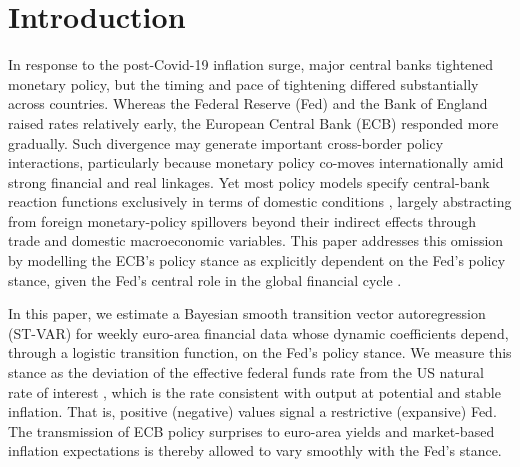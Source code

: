\section{Introduction}\label{sec:introduction}


In response to the post-Covid-19 inflation surge, major central banks tightened monetary policy, but the timing and pace of tightening differed substantially across countries. Whereas the Federal Reserve (Fed) and the Bank of England raised rates relatively early, the European Central Bank (ECB) responded more gradually. Such divergence may generate important cross-border policy interactions, particularly because monetary policy co-moves internationally amid strong financial and real linkages. Yet most policy models specify central-bank reaction functions exclusively in terms of domestic conditions \citep[see, e.g.,][]{del2013frbny}, largely abstracting from foreign monetary-policy spillovers beyond their indirect effects through trade and domestic macroeconomic variables. This paper addresses this omission by modelling the ECB's policy stance as explicitly dependent on the Fed's policy stance, given the Fed's central role in the global financial cycle \citep{miranda2020us}.

In this paper, we estimate a Bayesian smooth transition vector autoregression (ST-VAR) for weekly euro-area financial data whose dynamic coefficients depend, through a logistic transition function, on the Fed's policy stance. We measure this stance as the deviation of the effective federal funds rate from the US natural rate of interest \citep{laubach2003measuring}, which is the rate consistent with output at potential and stable inflation. That is, positive (negative) values signal a restrictive (expansive) Fed. The transmission of ECB policy surprises to euro-area yields and market-based inflation expectations is thereby allowed to vary smoothly with the Fed's stance.

